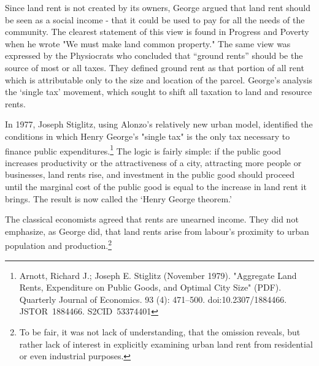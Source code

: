   Since land rent is not created by its owners, George argued that land rent should be seen as a social income - that it could be used to pay for all the needs of the community. The clearest statement of this view is found in Progress and Poverty when he wrote "We must make land common property." The same view was expressed by the Physiocrats who concluded  that ``ground rents'' should be the source of most or all taxes. They defined ground rent as that portion of all rent which is attributable only to the size and location of the parcel. George's analysis the `single tax' movement, which sought to shift all taxation to land  and resource rents.   

   
  In 1977, Joseph Stiglitz, using Alonzo's relatively new urban model, identified the conditions in which Henry George's "single tax" is  the only tax necessary to finance public expenditures.\footnote{Arnott, Richard J.; Joseph E. Stiglitz (November 1979). "Aggregate Land Rents, Expenditure on Public Goods, and Optimal City Size" (PDF). Quarterly Journal of Economics. 93 (4): 471–500. doi:10.2307/1884466. JSTOR 1884466. S2CID 53374401 }   The logic is fairly simple: if the public good increases productivity or the attractiveness of a city, attracting more people or businesses, land rents rise, and investment in the public good should proceed until the marginal cost of the public good is equal to the increase in land rent it brings. The result is now called the `Henry George theorem.'

The classical economists agreed that rents are unearned income. They did not emphasize, as George did, that land rents arise from labour's proximity to urban population and production.\footnote{To be fair, it was not lack of understanding, that the omission reveals, but rather lack of interest in explicitly examining urban land rent from residential or even industrial purposes.}%




